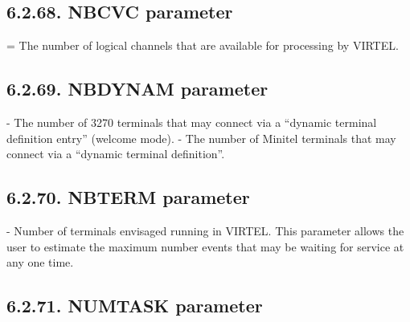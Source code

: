\documentclass[letterpaper,10pt,english]{sphinxmanual}
\begin{document}
\subsection{6.2.68. NBCVC parameter}
\label{\detokenize{Installation_Guide:nbcvc-parameter}}
\begin{sphinxVerbatim}[commandchars=\\\{\}]
 
\end{sphinxVerbatim}

 = The number of logical channels that are available for processing by VIRTEL.


\subsection{6.2.69. NBDYNAM parameter}
\label{\detokenize{Installation_Guide:nbdynam-parameter}}
\begin{sphinxVerbatim}[commandchars=\\\{\}]
 
\end{sphinxVerbatim}

 - The number of 3270 terminals that may connect via a “dynamic terminal definition entry” (welcome mode).
 - The number of Minitel terminals that may connect via a “dynamic terminal definition”.


\subsection{6.2.70. NBTERM parameter}
\label{\detokenize{Installation_Guide:nbterm-parameter}}
\begin{sphinxVerbatim}[commandchars=\\\{\}]
 
\end{sphinxVerbatim}

 - Number of terminals envisaged running in VIRTEL. This parameter allows the user to estimate the maximum number events that may be waiting for service at any one time.


\subsection{6.2.71. NUMTASK parameter}
\label{\detokenize{Installation_Guide:numtask-parameter}}
\begin{sphinxVerbatim}[commandchars=\\\{\}]
 
\end{sphinxVerbatim}
\end{document}
